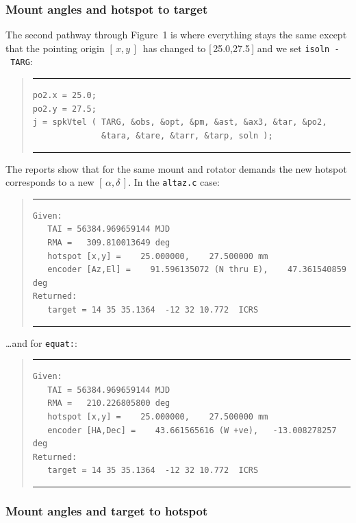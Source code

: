 \documentclass[11pt,fleqn,twoside,\paper]{article}
\renewcommand{\_}{{\tt\char'137}}     %
\newcommand{\radec}     {$[\,\alpha,\delta\,]$}
\newcommand{\xy}        {$[\,x,y\,]$}
\newcommand{\scode}     {\goodbreak
                         \begin{quote}
                         \vspace{-6ex}
                         \rule[-2ex]{36em}{0.03ex}}
\newcommand{\ecode}     {\rule[2ex]{36em}{0.03ex}
                         \end{quote}
                         \vspace{-4ex}
                         \goodbreak}
\begin{document}
\subsubsection{Mount angles and hotspot to target}

The second pathway through Figure~1 is where
everything stays the same except that the pointing origin \xy\
has changed to [\,25.0,27.5\,] and we set {\tt isoln~-~TARG}:
\scode\begin{verbatim}
po2.x = 25.0;
po2.y = 27.5;
j = spkVtel ( TARG, &obs, &opt, &pm, &ast, &ax3, &tar, &po2,
              &tara, &tare, &tarr, &tarp, soln );
\end{verbatim}\ecode
The reports show that for the same mount and rotator demands the
new hotspot corresponds to a new \radec.  In the {\tt altaz.c}
case:
\scode\begin{verbatim}
Given:
   TAI = 56384.969659144 MJD
   RMA =   309.810013649 deg
   hotspot [x,y] =    25.000000,    27.500000 mm
   encoder [Az,El] =    91.596135072 (N thru E),    47.361540859 deg
Returned:
   target = 14 35 35.1364  -12 32 10.772  ICRS
\end{verbatim}\ecode
\ldots and for {\tt equat:}:
\scode\begin{verbatim}
Given:
   TAI = 56384.969659144 MJD
   RMA =   210.226805800 deg
   hotspot [x,y] =    25.000000,    27.500000 mm
   encoder [HA,Dec] =    43.661565616 (W +ve),   -13.008278257 deg
Returned:
   target = 14 35 35.1364  -12 32 10.772  ICRS
\end{verbatim}\ecode

\subsubsection{Mount angles and target to hotspot}
\end{document}
